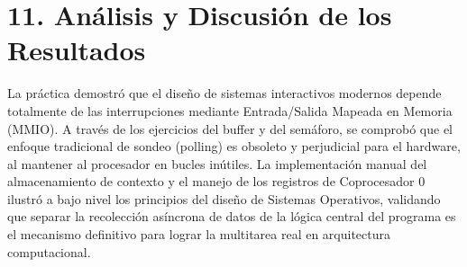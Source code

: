 \documentclass[12pt,a4paper]{article}
\begin{document}
\section*{11. Análisis y Discusión de los Resultados}
La práctica demostró que el diseño de sistemas interactivos modernos depende totalmente de las interrupciones mediante Entrada/Salida Mapeada en Memoria (MMIO). A través de los ejercicios del buffer y del semáforo, se comprobó que el enfoque tradicional de sondeo (polling) es obsoleto y perjudicial para el hardware, al mantener al procesador en bucles inútiles. La implementación manual del almacenamiento de contexto y el manejo de los registros de Coprocesador 0 ilustró a bajo nivel los principios del diseño de Sistemas Operativos, validando que separar la recolección asíncrona de datos de la lógica central del programa es el mecanismo definitivo para lograr la multitarea real en arquitectura computacional.
\end{document}
